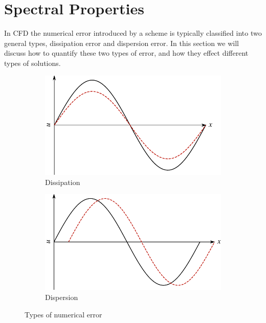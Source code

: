 \chapter{Spectral Properties}
In CFD the numerical error introduced by a scheme is typically classified into two general types, dissipation error and dispersion error. In this section we will discuss how to quantify these two types of error, and how they effect different types of solutions.

\begin{figure}[htbp]
	\centering
	\begin{subfigure}[b]{0.49\linewidth}
		\includegraphics[width=\linewidth]{Pictures/ch13_dissipation_diagram}
		\caption{Dissipation}
	\end{subfigure}
	\begin{subfigure}[b]{0.49\linewidth}
		\includegraphics[width=\linewidth]{Pictures/ch13_dispersion_diagram}
		\caption{Dispersion}
	\end{subfigure}
	\caption{Types of numerical error}
	\label{fig:numerical_error}
\end{figure}



